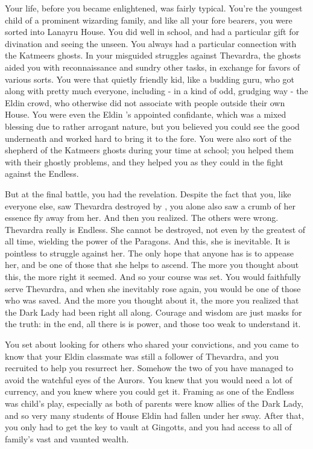 \documentclass[char]{Katmeers}
\begin{document}
\name{\cCrabbe{}}


Your life, before you became enlightened, was fairly typical. You're the youngest child of a prominent wizarding family, and like all your fore bearers, you were sorted into Lanayru House. You did well in school, and had a particular gift for divination and seeing the unseen. You always had a particular connection with the Katmeers ghosts. In your misguided struggles against Thevardra, the ghosts aided you with reconnaissance and sundry other tasks, in exchange for favors of various sorts. You were that quietly friendly kid, like a budding guru, who got along with pretty much everyone, including - in a kind of odd, grudging way - the Eldin crowd, who otherwise did not associate with people outside their own House. You were even the Eldin \cLucius{}'s appointed confidante, which was a mixed blessing due to \cLucius{\their} rather arrogant nature, but you believed you could see the good underneath and worked hard to bring it to the fore. You were also sort of the shepherd of the Katmeers ghosts during your time at school; you helped them with their ghostly problems, and they helped you as they could in the fight against the Endless.

But at the final battle, you had the revelation. Despite the fact that you, like everyone else, saw Thevardra destroyed by \cHarry{}, you alone also saw a crumb of her essence fly away from her. And then you realized. The others were wrong. Thevardra really is Endless. She cannot be destroyed, not even by the greatest \cHarry{\hero} of all time, wielding the power of the Paragons. And this, she is inevitable. It is pointless to struggle against her. The only hope that anyone has is to appease her, and be one of those that she helps to ascend. The more you thought about this, the more right it seemed. And so your course was set. You would faithfully serve Thevardra, and when she inevitably rose again, you would be one of those who was saved. And the more you thought about it, the more you realized that the Dark Lady had been right all along. Courage and wisdom are just masks for the truth: in the end, all there is is power, and those too weak to understand it.

You set about looking for others who shared your convictions, and you came to know that your Eldin classmate \cGoyle{} was still a follower of Thevardra, and you recruited \cGoyle{\them} to help you resurrect her. Somehow the two of you have managed to avoid the watchful eyes of the Aurors. You knew that you would need a lot of currency, and you knew where you could get it. Framing \cLucius{} as one of the Endless was child's play, especially as both of \cLucius{\their} parents were know allies of the Dark Lady, and so very many students of House Eldin had fallen under her sway. After that, you only had to get the key to \cLucius{\their} vault at Gingotts, and you had access to all of \cLucius{\their} family's vast and vaunted wealth.
\end{document}
